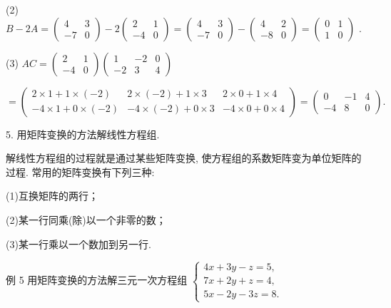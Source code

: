 \documentclass[10pt]{article}
\begin{document}
(2) \(B - {2A} = \left( \begin{matrix} 4 & 3 \\   - 7 & 0 \end{matrix}\right)  - 2\left( \begin{matrix} 2 & 1 \\   - 4 & 0 \end{matrix}\right)  = \left( \begin{matrix} 4 & 3 \\   - 7 & 0 \end{matrix}\right)  - \left( \begin{matrix} 4 & 2 \\   - 8 & 0 \end{matrix}\right)  = \left( \begin{array}{ll} 0 & 1 \\  1 & 0 \end{array}\right)\) .

(3) \({AC} = \left( \begin{matrix} 2 & 1 \\   - 4 & 0 \end{matrix}\right) \left( \begin{matrix} 1 &  - 2 & 0 \\   - 2 & 3 & 4 \end{matrix}\right)\)

\(= \left( \begin{array}{rrr} 2 \times  1 + 1 \times  \left( {-2}\right) & 2 \times  \left( {-2}\right)  + 1 \times  3 & 2 \times  0 + 1 \times  4 \\   - 4 \times  1 + 0 \times  \left( {-2}\right) &  - 4 \times  \left( {-2}\right)  + 0 \times  3 &  - 4 \times  0 + 0 \times  4 \end{array}\right)  = \left( \begin{array}{rrr} 0 &  - 1 & 4 \\   - 4 & 8 & 0 \end{array}\right) .\)

5. 用矩阵变换的方法解线性方程组.

解线性方程组的过程就是通过某些矩阵变换, 使方程组的系数矩阵变为单位矩阵的过程. 常用的矩阵变换有下列三种:

(1)互换矩阵的两行；

(2)某一行同乘(除)以一个非零的数；

(3)某一行乘以一个数加到另一行.

例 5 用矩阵变换的方法解三元一次方程组 \(\left\{  \begin{array}{l} {4x} + {3y} - z = 5, \\  {7x} + {2y} + z = 4, \\  {5x} - {2y} - {3z} = 8. \end{array}\right.\)
\end{document}
